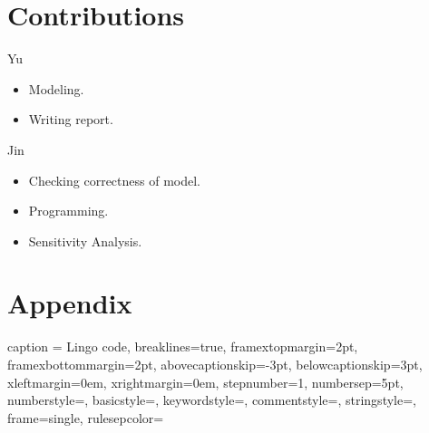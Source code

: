 \documentclass[12pt]{article}
\begin{document}
\begin{itemize}



	
\end{itemize}

\section{Contributions}
Yu
\begin{itemize}
	\item Modeling.
	\item Writing report.
\end{itemize}

Jin
\begin{itemize}
	\item Checking correctness of model. 
	\item Programming.
	\item Sensitivity Analysis.
\end{itemize}

\newpage
\section{Appendix}
\begin{changemargin}{0.0 cm}{0.0 cm} 

\lstset
{
caption = Lingo code,
breaklines=true,
framextopmargin=2pt,
framexbottommargin=2pt,
abovecaptionskip=-3pt,
belowcaptionskip=3pt,
xleftmargin=0em,
xrightmargin=0em, 
stepnumber=1,
numbersep=5pt,
numberstyle=\small\color{black},
basicstyle=\ttfamily,
keywordstyle=\color{black},
commentstyle=\color{black},
stringstyle=\color{black},
frame=single,
rulesepcolor=\color{red!20!green!20!blue!20}
}

\end{changemargin}


\end{document}
